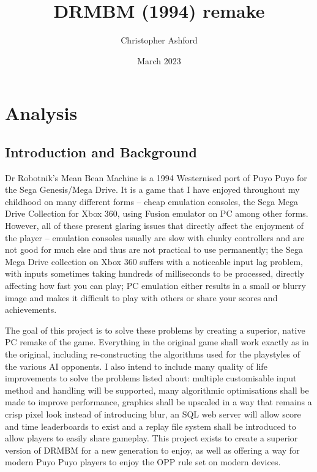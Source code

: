 \documentclass{report}
\title{DRMBM (1994) remake}
\author{Christopher Ashford}
\date{March 2023}
\begin{document}
\maketitle

\tableofcontents

\chapter{Analysis}

\section{Introduction and Background}

Dr Robotnik’s Mean Bean Machine is a 1994 Westernised port of Puyo Puyo for the Sega Genesis/Mega Drive. It is a game that I have enjoyed throughout my childhood on many different forms – cheap emulation consoles, the Sega Mega Drive Collection for Xbox 360, using Fusion emulator on PC among other forms. However, all of these present glaring issues that directly affect the enjoyment of the player – emulation consoles usually are slow with clunky controllers and are not good for much else and thus are not practical to use permanently; the Sega Mega Drive collection on Xbox 360 suffers with a noticeable input lag problem, with inputs sometimes taking hundreds of milliseconds to be processed, directly affecting how fast you can play; PC emulation either results in a small or blurry image and makes it difficult to play with others or share your scores and achievements.

The goal of this project is to solve these problems by creating a superior, native PC remake of the game. Everything in the original game shall work exactly as in the original, including re-constructing the algorithms used for the playstyles of the various AI opponents. I also intend to include many quality of life improvements to solve the problems listed about: multiple customisable input method and handling will be supported, many algorithmic optimisations shall be made to improve performance, graphics shall be upscaled in a way that remains a crisp pixel look instead of introducing blur, an SQL web server will allow score and time leaderboards to exist and a replay file system shall be introduced to allow players to easily share gameplay. This project exists to create a superior version of DRMBM for a new generation to enjoy, as well as offering a way for modern Puyo Puyo players to enjoy the OPP rule set on modern devices.
\end{document}
